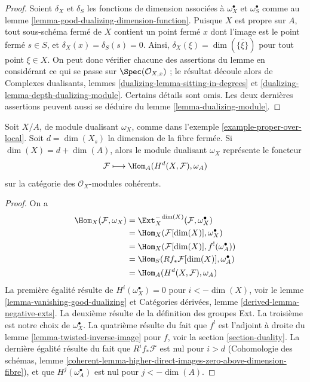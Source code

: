 \begin{proof}
Soient $\delta_X$ et $\delta_S$ les fonctions de dimension associées à $\omega_X^\bullet$ et $\omega_S^\bullet$ comme au lemme \ref{lemma-good-dualizing-dimension-function}. Puisque $X$ est propre sur $A$, tout sous-schéma fermé de $X$ contient un point fermé $x$ dont l'image est le point fermé $s \in S$, et $\delta_X(x) = \delta_S(s) = 0$. Ainsi, $\delta_X(\xi) = \dim(\overline{\{\xi\}})$ pour tout point $\xi \in X$. On peut donc vérifier chacune des assertions du lemme en considérant ce qui se passe sur $\Spec(\mathcal{O}_{X, x})$ ; le résultat découle alors de Complexes dualisants, lemmes \ref{dualizing-lemma-sitting-in-degrees} et \ref{dualizing-lemma-depth-dualizing-module}. Certains détails sont omis. Les deux dernières assertions peuvent aussi se déduire du lemme \ref{lemma-dualizing-module}.
\end{proof}

\begin{lemma}
\label{lemma-dualizing-module-proper-over-A}
Soit $X/A$, de module dualisant $\omega_X$, comme dans l'exemple \ref{example-proper-over-local}. Soit $d = \dim(X_s)$ la dimension de la fibre fermée. Si $\dim(X) = d + \dim(A)$, alors le module dualisant $\omega_X$ représente le foncteur
$$
\mathcal{F} \longmapsto \Hom_A(H^d(X, \mathcal{F}), \omega_A)
$$
sur la catégorie des $\mathcal{O}_X$-modules cohérents.
\end{lemma}

\begin{proof}
On a
\begin{align*}
\Hom_X(\mathcal{F}, \omega_X)
& =
\Ext^{-\dim(X)}_X(\mathcal{F}, \omega_X^\bullet) \\
& =
\Hom_X(\mathcal{F}[\dim(X)], \omega_X^\bullet) \\
& =
\Hom_X(\mathcal{F}[\dim(X)], f^!(\omega_A^\bullet)) \\
& =
\Hom_S(Rf_*\mathcal{F}[\dim(X)], \omega_A^\bullet) \\
& =
\Hom_A(H^d(X, \mathcal{F}), \omega_A)
\end{align*}
La première égalité résulte de $H^i(\omega_X^\bullet) = 0$ pour $i < -\dim(X)$, voir le lemme \ref{lemma-vanishing-good-dualizing} et Catégories dérivées, lemme \ref{derived-lemma-negative-exts}. La deuxième résulte de la définition des groupes Ext. La troisième est notre choix de $\omega_X^\bullet$. La quatrième résulte du fait que $f^!$ est l'adjoint à droite du lemme \ref{lemma-twisted-inverse-image} pour $f$, voir la section \ref{section-duality}. La dernière égalité résulte du fait que $R^if_*\mathcal{F}$ est nul pour $i > d$ (Cohomologie des schémas, lemme \ref{coherent-lemma-higher-direct-images-zero-above-dimension-fibre}), et que $H^j(\omega_A^\bullet)$ est nul pour $j < -\dim(A)$.
\end{proof}








